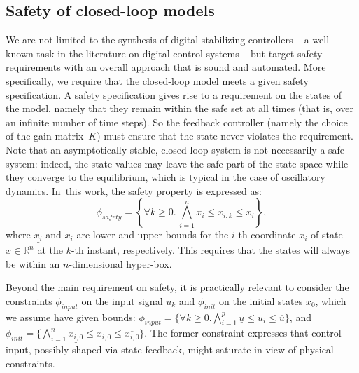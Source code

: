 \subsection{Safety of closed-loop models}
\label{sec:safety}

We are not limited to the synthesis of digital stabilizing controllers -- a
well known task in the literature on digital control systems -- but target
safety requirements with an overall approach that is sound and automated. 
More specifically, we require that the closed-loop model 
meets a given safety specification.  
A safety specification gives rise to a requirement on the states of the model, 
namely that they remain within the safe set at all times (that is, over an infinite number of time steps).  
So the feedback controller (namely the choice of the gain matrix~$K$)
must ensure that the state never violates the requirement.  Note that an asymptotically 
stable, closed-loop system is not necessarily a safe system: indeed, the 
state values may leave the safe part of the state space while they converge
to the equilibrium, which is typical in the case of oscillatory dynamics. 
In~this work, the safety property is expressed as: 
%
\begin{equation}
\label{eq:safetyliteral}
\phi_\mathit{safety} = \left\{ \forall k\ge 0.\, \bigwedge_{i=1}^{n}{\underline{x_{i}} \leq x_{i,k} \leq \overline{x_{i}}}\right\},
\end{equation}
%
%
where $\underline{x_{i}}$ and $\overline{x_{i}}$ are lower and upper bounds
for the $i$-th coordinate $x_{i}$ of state $x\in \mathbb R^n$ 
at the $k$-th instant, respectively.  This requires that the states will always be within an $n$-dimensional hyper-box.

\medskip 

Beyond the main requirement on safety, it is practically relevant to consider the 
constraints $\phi_\mathit{input}$ on the input
signal $u_{k}$ and $\phi_\mathit{init}$ on the initial states $x_0$,
which we assume have given bounds:
$\phi_\mathit{input} = \{\forall k \geq 0.\bigwedge_{i=1}^{p} \underline{u} \leq u_{i} \leq \overline{u}\} $,
and $\phi_\mathit{init} = \{ \bigwedge_{i=1}^{n} \underline{x_{i,0}} \leq x_{i,0} \leq \overline{x_{i,0}}\}$. 
The former constraint expresses that control input, possibly shaped via state-feedback, 
might saturate in view of physical constraints.


